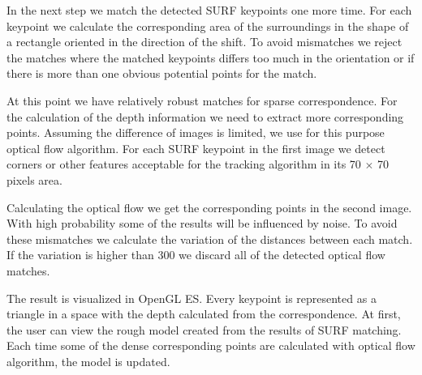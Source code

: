 In the next step we match the detected SURF keypoints one more time.
For each keypoint we calculate the corresponding area of the surroundings in the shape of a rectangle oriented in the direction of the shift. 
To avoid mismatches we reject the matches where the matched keypoints differs too much in the orientation or if there is more than one obvious potential points for the match.



At this point we have relatively robust matches for sparse correspondence. 
For the calculation of the depth information we need to extract more corresponding points.
Assuming the difference of images is limited, we use for this purpose optical flow algorithm. 
For each SURF keypoint in the first image we detect corners or other features acceptable for the tracking algorithm in its 70 $\times$ 70 pixels area.


Calculating the optical flow we get the corresponding points in the second image.
With high probability some of the results will be influenced by noise.
To avoid these mismatches we calculate the variation of the distances between each match.
If the variation is higher than 300 we discard all of the detected optical flow matches.

The result is visualized in OpenGL ES.
Every keypoint is represented as a triangle in a space with the depth calculated from the correspondence.
At first, the user can view the rough model created from the results of SURF matching.
Each time some of the dense corresponding points are calculated with optical flow algorithm, the model is updated.


